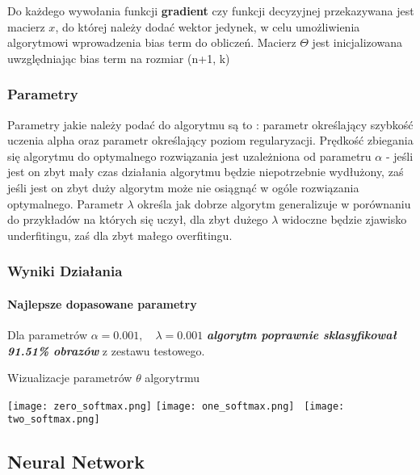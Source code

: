 \documentclass[11pt]{article}
\begin{document}
    Do każdego wywołania funkcji \textbf{gradient} czy funkcji decyzyjnej
przekazywana jest macierz \(x\), do której należy dodać wektor jedynek,
w celu umożliwienia algorytmowi wprowadzenia bias term do obliczeń.
Macierz \(\Theta\) jest inicjalizowana uwzględniając bias term na
rozmiar (n+1, k)

    \hypertarget{parametry}{%
\subsubsection{Parametry}\label{parametry}}

Parametry jakie należy podać do algorytmu są to : parametr określający
szybkość uczenia alpha oraz parametr określający poziom regularyzacji.
Prędkość zbiegania się algorytmu do optymalnego rozwiązania jest
uzależniona od parametru \(\alpha\) - jeśli jest on zbyt mały czas
działania algorytmu będzie niepotrzebnie wydłużony, zaś jeśli jest on
zbyt duży algorytm może nie osiągnąć w ogóle rozwiązania optymalnego.
Parametr \(\lambda\) określa jak dobrze algorytm generalizuje w
porównaniu do przykładów na których się uczył, dla zbyt dużego
\(\lambda\) widoczne będzie zjawisko underfitingu, zaś dla zbyt małego
overfitingu.
\clearpage
\hypertarget{wyniki-dziaux142ania}{%
\subsubsection{Wyniki Działania}\label{wyniki-dziaux142ania}}

\hypertarget{najlepsze-dopasowane-parametry}{%
\paragraph{Najlepsze dopasowane
parametry}\label{najlepsze-dopasowane-parametry}}

Dla parametrów \(\alpha = 0.001, \quad \lambda = 0.001\)
\textbf{\emph{algorytm poprawnie sklasyfikował 91.51\% obrazów}} z
zestawu testowego.

Wizualizacje parametrów \(\theta\) algorytrmu


\texttt{[image: zero\_softmax.png]} \endminipage\hfill
{}
\texttt{[image: one\_softmax.png]} \endminipage\hfill
{}\
\texttt{[image: two\_softmax.png]} \endminipage

    \hypertarget{neural-network}{%
\subsection{Neural Network}\label{neural-network}}
\end{document}
